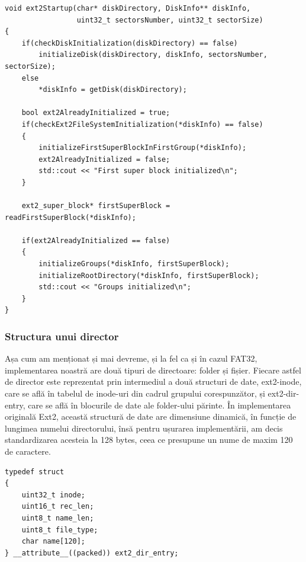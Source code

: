 \lstset{style=code-snyppet-style}
\begin{lstlisting}
void ext2Startup(char* diskDirectory, DiskInfo** diskInfo, 
                 uint32_t sectorsNumber, uint32_t sectorSize)
{
    if(checkDiskInitialization(diskDirectory) == false)
        initializeDisk(diskDirectory, diskInfo, sectorsNumber, sectorSize);
    else
        *diskInfo = getDisk(diskDirectory);

    bool ext2AlreadyInitialized = true;
    if(checkExt2FileSystemInitialization(*diskInfo) == false)
    {
        initializeFirstSuperBlockInFirstGroup(*diskInfo);
        ext2AlreadyInitialized = false;
        std::cout << "First super block initialized\n";
    }

    ext2_super_block* firstSuperBlock = readFirstSuperBlock(*diskInfo);

    if(ext2AlreadyInitialized == false)
    {
        initializeGroups(*diskInfo, firstSuperBlock);
        initializeRootDirectory(*diskInfo, firstSuperBlock);
        std::cout << "Groups initialized\n";
    }
}
\end{lstlisting}

\bigskip

\subsubsection{Structura unui director}

Așa cum am menționat și mai devreme, și la fel ca și în cazul FAT32, implementarea noastră are două tipuri de directoare: folder și fișier. Fiecare astfel de director este reprezentat prin intermediul a două structuri de date, ext2-inode, care se află în tabelul de inode-uri din cadrul grupului corespunzător, și ext2-dir-entry, care se află în blocurile de date ale folder-ului părinte. În implementarea originală Ext2, această structură de date are dimensiune dinamică, în funcție de lungimea numelui directorului, însă pentru ușurarea implementării, am decis standardizarea acesteia la 128 bytes, ceea ce presupune un nume de maxim 120 de caractere.

\bigskip

\lstset{style=code-snyppet-style}
\begin{lstlisting}
typedef struct
{
    uint32_t inode;
    uint16_t rec_len;
    uint8_t name_len;
    uint8_t file_type;
    char name[120]; 
} __attribute__((packed)) ext2_dir_entry;
\end{lstlisting}

\bigskip

